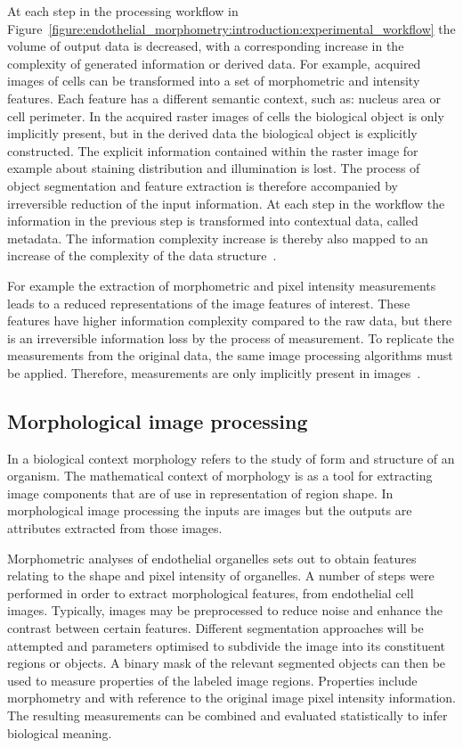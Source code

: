 At each step in the processing workflow in Figure~\ref{figure:endothelial_morphometry:introduction:experimental_workflow} the volume of output data is decreased, with a corresponding increase in the complexity of generated information or derived data. For example, acquired images of cells can be transformed into a set of morphometric and intensity features. Each feature has a different semantic context, such as: nucleus area or cell perimeter. In the acquired raster images of cells the biological object is only implicitly present, but in the derived data the biological object is explicitly constructed. The explicit information contained within the raster image for example about staining distribution and illumination is lost. The process of object segmentation and feature extraction is therefore accompanied by irreversible reduction of the input information. At each step in the workflow the information in the previous step is transformed into contextual data, called metadata. The information complexity increase is thereby also mapped to an increase of the complexity of the data structure~\cite{Prodanov2012}.

For example the extraction of morphometric and pixel intensity measurements leads to a reduced representations of the image features of interest. These features have higher information complexity compared to the raw data, but there is an irreversible information loss by the process of measurement. To replicate the measurements from the original data, the same image processing algorithms must be applied. Therefore, measurements are only implicitly present in images~\cite{Prodanov2012}.

\subsection{Morphological image processing}
In a biological context morphology refers to the study of form and structure of an organism. The mathematical context of morphology is as a tool for extracting image components that are of use in representation of region shape. In morphological image processing the inputs are images but the outputs are attributes extracted from those images.

Morphometric analyses of endothelial organelles sets out to obtain features relating to the shape and pixel intensity of organelles. A number of steps were performed in order to extract morphological features, from endothelial cell images. Typically, images may be preprocessed to reduce noise and enhance the contrast between certain features. Different segmentation approaches will be attempted and parameters optimised to subdivide the image into its constituent regions or objects. A binary mask of the relevant segmented objects can then be used to measure properties of the labeled image regions. Properties include morphometry and with reference to the original image pixel intensity information. The resulting measurements can be combined and evaluated statistically to infer biological meaning.




